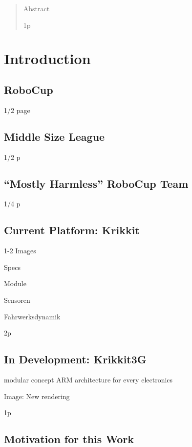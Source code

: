 \documentclass[12pt,a4paper]{article}
\begin{document}


\tableofcontents
\clearpage
\pagestyle{plain}



\begin{abstract}
Abstract

1p
\end{abstract}

\clearpage

\section{Introduction}


\subsection{RoboCup}

1/2 page

\subsection{Middle Size League}
1/2 p

\subsection{``Mostly Harmless'' RoboCup Team}
1/4 p

\subsection{Current Platform: Krikkit}

1-2 Images
  
  Specs

    Module
      
    Sensoren
    
    Fahrwerksdynamik

2p

\subsection{In Development: Krikkit3G}

    modular concept
    ARM architecture for every electronics

Image: New rendering

1p

\subsection{Motivation for this Work}
    
\end{document}
